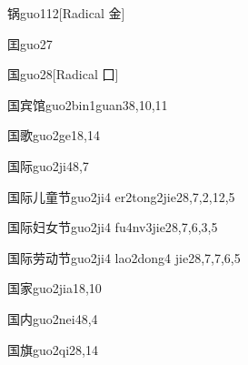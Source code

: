 \begin{verbete}{锅}{guo1}{12}[Radical 金]
\end{verbete}

\begin{verbete}{囯}{guo2}{7}
\end{verbete}

\begin{verbete}{国}{guo2}{8}[Radical ⼞]
\end{verbete}

\begin{verbete}{国宾馆}{guo2bin1guan3}{8,10,11}
\end{verbete}

\begin{verbete}{国歌}{guo2ge1}{8,14}
\end{verbete}

\begin{verbete}{国际}{guo2ji4}{8,7}
\end{verbete}

\begin{verbete}{国际儿童节}{guo2ji4 er2tong2jie2}{8,7,2,12,5}
\end{verbete}

\begin{verbete}{国际妇女节}{guo2ji4 fu4nv3jie2}{8,7,6,3,5}
\end{verbete}

\begin{verbete}{国际劳动节}{guo2ji4 lao2dong4 jie2}{8,7,7,6,5}
\end{verbete}

\begin{verbete}{国家}{guo2jia1}{8,10}
\end{verbete}

\begin{verbete}{国内}{guo2nei4}{8,4}
\end{verbete}

\begin{verbete}{国旗}{guo2qi2}{8,14}
\end{verbete}

